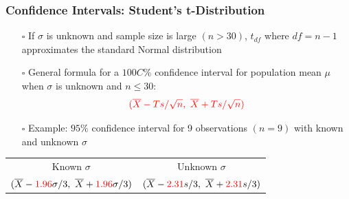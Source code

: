 \documentclass[handout]{beamer}
\begin{document}
\begin{frame}
    \frametitle{Confidence Intervals: Student's t-Distribution}
    \begin{itemize}[wide = 0pt]
        \item[$\square$] If $\sigma$ is unknown and sample size is large $(n>30)$, $t_{df}$ where $df=n-1$ approximates the standard Normal distribution
        \item[$\square$] General formula for a $100C\%$ confidence interval for population mean $\mu$ when $\sigma$ is unknown and $n\leq30$:
        \begin{equation*}
            {\color{red}(\overline{X}-Ts/{\sqrt{n}},\ \overline{X}+Ts/{\sqrt{n}})}
        \end{equation*}
        \item[$\square$] Example: $95\%$ confidence interval for 9 observations $(n=9)$ with known and unknown $\sigma$
    \end{itemize}
    \vspace{5pt}
    \centering
    \begin{tabular}{c c}
    \toprule
         Known $\sigma$ & Unknown $\sigma$ \\
         $(\overline{X}-{\color{red}1.96}\sigma/3,\ \overline{X}+{\color{red}1.96}\sigma/3)$ & $(\overline{X}-{\color{red}2.31}s/3,\ \overline{X}+{\color{red}2.31}s/3)$\\
    \bottomrule
    \end{tabular}
    \vspace*{\fill}
\end{frame}
\end{document}
